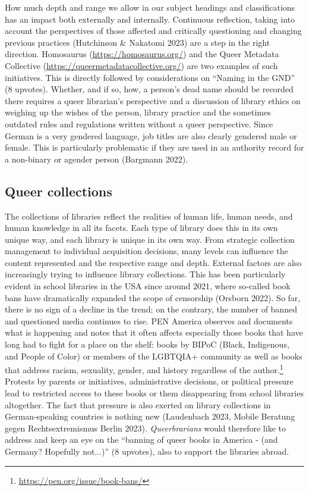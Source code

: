 \documentclass[a4paper,
fontsize=11pt,
oneside,
numbers=noperiodatend,
parskip=half-,
bibliography=totoc,
final
]{scrartcl}
\begin{document}
How much depth and range we allow in our subject headings and
classifications has an impact both externally and internally. Continuous
reflection, taking into account the perspectives of those affected and
critically questioning and changing previous practices (Hutchinson \&
Nakatomi 2023) are a step in the right direction. Homosaurus
(\url{https://homosaurus.org/}) and the Queer Metadata Collective
(\url{https://queermetadatacollective.org/}) are two examples of such
initiatives. This is directly followed by considerations on \enquote{Naming in
the GND} (8 upvotes). Whether, and if so, how, a
person's dead name should be recorded there requires a
queer librarian's perspective and a discussion of
library ethics on weighing up the wishes of the person, library practice
and the sometimes outdated rules and regulations written without a queer
perspective. Since German is a very gendered language, job titles are
also clearly gendered male or female. This is particularly problematic
if they are used in an authority record for a non-binary or agender
person (Bargmann 2022).

\hypertarget{queer-collections}{%
\subsection{Queer collections}\label{queer-collections}}

The collections of libraries reflect the realities of human life, human
needs, and human knowledge in all its facets. Each type of library does
this in its own unique way, and each library is unique in its own way.
From strategic collection management to individual acquisition
decisions, many levels can influence the content represented and the
respective range and depth. External factors are also increasingly
trying to influence library collections. This has been particularly
evident in school libraries in the USA since around 2021, where
so-called book bans have dramatically expanded the scope of censorship
(Orsborn 2022). So far, there is no sign of a decline in the trend; on
the contrary, the number of banned and questioned media continues to
rise. PEN America observes and documents what is happening and notes
that it often affects especially those books that have long had to fight
for a place on the shelf: books by BIPoC (Black, Indigenous, and People
of Color) or members of the LGBTQIA+ community as well as books that
address racism, sexuality, gender, and history regardless of the
author.\footnote{\url{https://pen.org/issue/book-bans/}} Protests by
parents or initiatives, administrative decisions, or political pressure
lead to restricted access to these books or them disappearing from
school libraries altogether. The fact that pressure is also exerted on
library collections in German-speaking countries is nothing new
(Laudenbach 2023, Mobile Beratung gegen Rechtsextremismus Berlin 2023).
\emph{Queerbrarians} would therefore like to address and keep an eye on
the \enquote{banning of queer books in America - (and Germany? Hopefully
not...)} (8 upvotes), also to support the libraries abroad.
\end{document}
